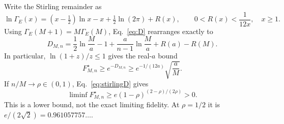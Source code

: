 \documentclass[11pt,a4paper]{article}
\newcommand{\GE}{\Gamma_{\!E}}
\begin{document}
Write the Stirling remainder as
\begin{equation}
 \ln\GE(x)=(x-\tfrac12)\ln x-x+\tfrac12\ln(2\pi)+R(x),
 \qquad 0<R(x)<\frac1{12x},\quad x\ge1.
\end{equation}
Using \(\GE(M+1)=M\GE(M)\), Eq.~\eqref{eq:D} rearranges exactly to
\begin{equation}
 D_{M,n}=\frac12\ln\frac Ma-1+
 \frac a{n-1}\ln\frac Ma+R(a)-R(M).
 \label{eq:stirlingD}
\end{equation}
In particular, \(\ln(1+z)/z\le1\) gives the real-\(a\) bound
\begin{equation}
 F_{M,n}^\star\ge e^{-D_{M,n}}
 \ge e^{-1/(12a)}\sqrt{\frac aM}.
 \label{eq:realalower}
\end{equation}
If \(n/M\to\rho\in(0,1)\), Eq.~\eqref{eq:stirlingD} gives
\begin{equation}
 \liminf F_{M,n}^\star\ge
 e(1-\rho)^{(2-\rho)/(2\rho)}>0.
 \label{eq:fraction}
\end{equation}
This is a lower bound, not the exact limiting fidelity. At
\(\rho=1/2\) it is \(e/(2\sqrt2)=0.961057757\ldots\).
\end{document}
